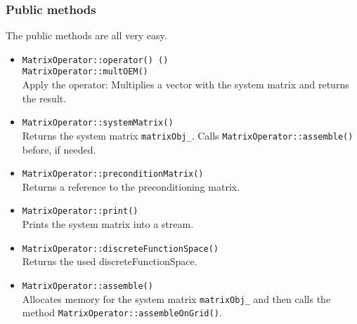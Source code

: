 \subsubsection{Public methods}
The public methods are all very easy.
\begin{itemize}
 \item \texttt{MatrixOperator::operator() ()}\\
       \texttt{MatrixOperator::multOEM()}\\
    Apply the operator: Multiplies a vector with the system matrix and returns the result.

 \item \texttt{MatrixOperator::systemMatrix()}\\
    Returns the system matrix \texttt{matrixObj\_}. Calls \texttt{MatrixOperator::assemble()} before, if needed.

 \item \texttt{MatrixOperator::preconditionMatrix()}\\
    Returns a reference to the preconditioning matrix.

 \item \texttt{MatrixOperator::print()}\\
    Prints the system matrix into a stream.

 \item \texttt{MatrixOperator::discreteFunctionSpace()}\\
    Returns the used discreteFunctionSpace.

 \item \texttt{MatrixOperator::assemble()}\\
    Allocates memory for the system matrix \texttt{matrixObj\_} and then
    calls the method \texttt{MatrixOperator::assembleOnGrid()}.
\end{itemize}


